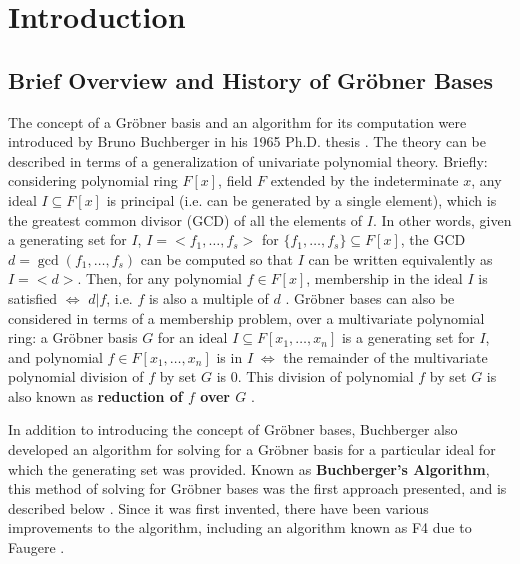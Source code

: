 \documentclass[letterpaper,12pt,titlepage,oneside,final]{book}
\begin{document}
\tableofcontents
\listoffigures
\mainmatter

\chapter{Introduction}

\section{Brief Overview and History of Gr\"obner Bases}
 
The concept of a Gr\"obner basis and an algorithm for its computation were introduced by Bruno Buchberger in his 1965 Ph.D. thesis \cite{appls}.  The theory can be described in terms of a generalization of univariate polynomial theory.  Briefly: considering polynomial ring ${F[x]}$, field ${F}$ extended by the indeterminate ${x}$, any ideal ${I \subseteq F[x]}$ is principal (i.e. can be generated by a single element), which is the greatest common divisor (GCD) of all the elements of ${I}$.  In other words, given a generating set for ${I}$, ${I = <f_1, \ldots, f_s>}$ for ${\{f_1, \ldots, f_s\} \subseteq F[x]}$, the GCD ${d = \gcd(f_1, \ldots, f_s)}$ can be computed so that ${I}$ can be written equivalently as ${I = <d>}$.  Then, for any polynomial ${f \in F[x]}$, membership in the ideal ${I}$ is satisfied ${\iff}$ ${d | f}$, i.e. ${f}$ is also a multiple of ${d}$ \cite{Adams}.  Gr\"obner bases can also be considered in terms of a membership problem, over a multivariate polynomial ring: a Gr\"obner basis ${G}$ for an ideal ${I \subseteq F[x_1, \ldots, x_n]}$ is a generating set for ${I}$, and polynomial ${f \in F[x_1, \ldots, x_n]}$ is in ${I \; \iff}$ the remainder of the multivariate polynomial division of ${f}$ by set ${G}$ is 0.  This division of polynomial ${f}$ by set ${G}$ is also known as \textbf{reduction of ${f}$ over ${G}$} \cite{Geddes}. 

In addition to introducing the concept of Gr\"obner bases, Buchberger also developed an algorithm for solving for a Gr\"obner basis for a particular ideal for which the generating set was provided.  Known as \textbf{Buchberger's Algorithm}, this method of solving for Gr\"obner bases was the first approach presented, and is described below \cite{Adams}.  Since it was first invented, there have been various improvements to the algorithm, including an algorithm known as F4 due to Faugere \cite{faugere}.    
\end{document}
